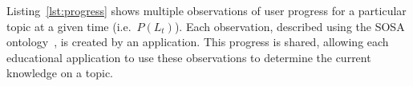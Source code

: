 Listing~\ref{lst:progress} shows multiple observations of user progress for a particular topic at a given time (i.e.~$P(L_t)$). Each observation, described using the SOSA ontology~\cite{janowicz2010stimulus,janowicz2019sosa}, is created by an application. This progress is shared, allowing each educational application to use these observations to determine the current knowledge on a topic.



